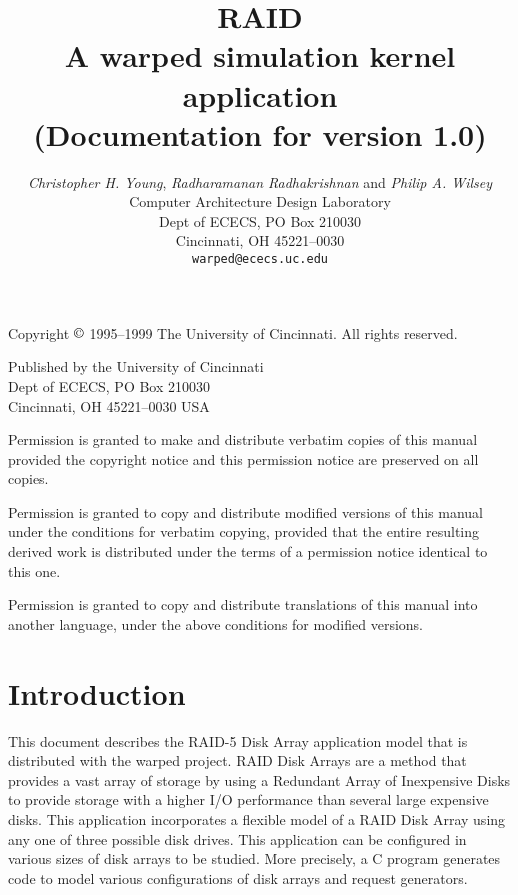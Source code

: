 \documentclass[11pt]{report}
\newcommand{\version}{1.0}
\begin{document}
\title{
\textbf{RAID}\\
A {\sc warped} simulation kernel application\\
(Documentation for version \version)}

\author{
\emph{Christopher H. Young}, \emph{Radharamanan Radhakrishnan} and \emph{Philip A.  Wilsey} \\
Computer Architecture Design Laboratory \\
Dept of ECECS, PO Box 210030 \\
Cincinnati, OH  45221--0030 \\
\texttt{warped@ececs.uc.edu}
}

\date{}

\maketitle

\vspace*{6in}

\noindent
Copyright $\copyright$ 1995--1999 The University of Cincinnati.  All
rights reserved.  

\bigskip

\noindent
Published by the University of Cincinnati \\
Dept of ECECS, PO Box 210030 \\
Cincinnati, OH  45221--0030 USA 

\bigskip

\noindent
Permission is granted to make and distribute verbatim copies of
this manual provided the copyright notice and this permission notice
are preserved on all copies.

\medskip
\noindent
Permission is granted to copy and distribute modified versions of this
manual under the conditions for verbatim copying, provided that the entire
resulting derived work is distributed under the terms of a permission
notice identical to this one.

\medskip
\noindent
Permission is granted to copy and distribute translations of this manual
into another language, under the above conditions for modified versions.

\newpage

\chapter{Introduction}

This document describes the RAID-5 Disk Array application model that is
distributed with the {\sc warped} project.  RAID Disk Arrays are a method
that provides a vast array of storage by using a Redundant Array of
Inexpensive Disks to provide storage with a higher I/O performance than
several large expensive disks.  This application incorporates a flexible
model of a RAID Disk Array using any one of three possible disk drives.
This application can be configured in various sizes of disk arrays to be
studied.  More precisely, a C program generates code to model various
configurations of disk arrays and request generators. 
\end{document}
